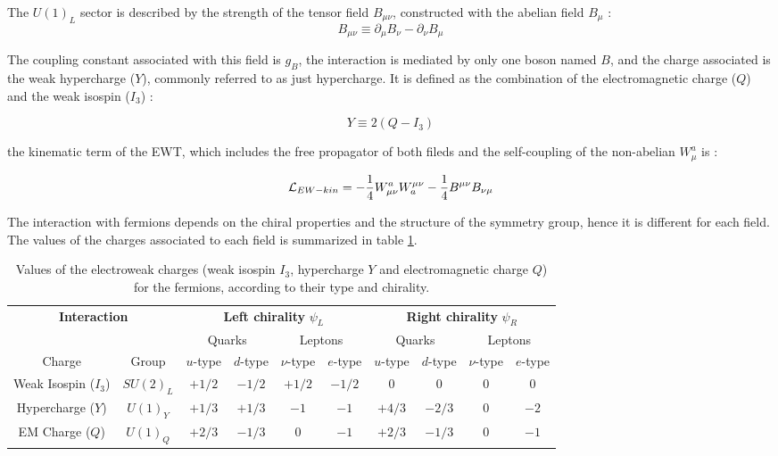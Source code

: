 The $U(1)_L$ sector is described by the strength of the tensor field $B_{\mu\nu}$, constructed with the abelian field $B_{\mu}$ :
\begin{equation}
    B_{\mu\nu} \equiv \partial_{\mu}B_{\nu} - \partial_{\nu}B_{\mu}
\end{equation}

The coupling constant associated with this field is $g_B$, the interaction is mediated by only one boson named $B$, and the charge associated is the weak hypercharge ($Y$), commonly referred to as just hypercharge. It is defined as the combination of the electromagnetic charge ($Q$) and the weak isospin ($I_3$) :

\begin{equation}
    Y \equiv 2(Q - I_3)
\end{equation}

the kinematic term of the EWT, which includes the free propagator of both fileds and the self-coupling of the non-abelian $W_{\mu}^a$ is :

\begin{equation}
    \mathcal{L}_{EW-kin} = -\frac{1}{4}W_{\mu\nu}^a W^{\mu\nu}_a - \frac{1}{4} B^{\mu\nu}B_{\nu\mu}
\end{equation}

The interaction with fermions depends on the chiral properties and the structure of the symmetry group, hence it is different for each field. The values of the charges associated to each field is summarized in table \ref{tab:hypercharge}.

\begin{table}[h]
    \centering
    \begin{tabular}{c c | c c | c c | c c | c c}
        \multicolumn{2}{c}{\multirow{2}{*}{\textbf{Interaction}}} & \multicolumn{4}{c}{\textbf{Left chirality} $\psi_L$} & \multicolumn{4}{c}{\textbf{Right chirality} $\psi_R$} \\
         & & \multicolumn{2}{c}{Quarks} & \multicolumn{2}{c}{Leptons} & \multicolumn{2}{c}{Quarks} & \multicolumn{2}{c}{Leptons} \\
         \hline
         Charge & Group & $u$-type & $d$-type & $\nu$-type & $e$-type & $u$-type & $d$-type & $\nu$-type & $e$-type \\
         \hline
         Weak Isospin ($I_3$) & $SU(2)_L$ & $+1/2$ & $-1/2$ & $+1/2$ & $-1/2$ & $0$ & $0$ & $0$ & $0$ \\
         Hypercharge ($Y$) & $U(1)_Y$ & $+1/3$ & $+1/3$ & $-1$ & $-1$ & $+4/3$ & $-2/3$ & $0$ & $-2$ \\
         EM Charge ($Q$) & $U(1)_Q$ & $+2/3$ & $-1/3$ & $0$ & $-1$ & $+2/3$ & $-1/3$ & $0$ & $-1$ \\
         \hline
    \end{tabular}
    \caption{Values of the electroweak charges (weak isospin $I_3$, hypercharge $Y$ and electromagnetic charge $Q$) for the fermions, according to their type and chirality.}
    \label{tab:hypercharge}
\end{table}

